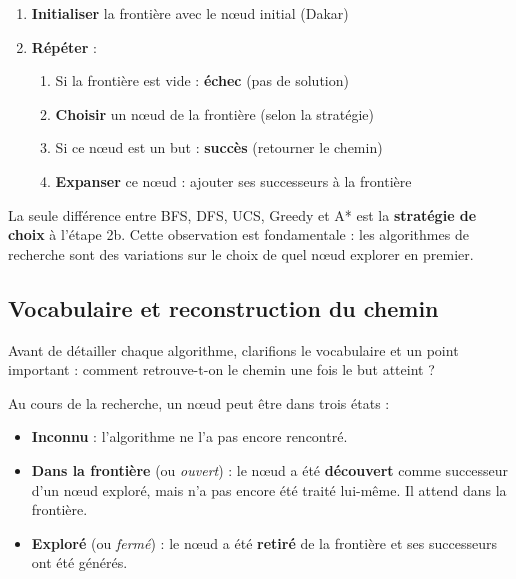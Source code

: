 \documentclass[11pt,a4paper]{article}
\begin{document}
\begin{recipebox}
\begin{enumerate}
    \item \textbf{Initialiser} la frontière avec le nœud initial (Dakar)
    \item \textbf{Répéter} :
    \begin{enumerate}
        \item Si la frontière est vide : \textbf{échec} (pas de solution)
        \item \textbf{Choisir} un nœud de la frontière (selon la stratégie)
        \item Si ce nœud est un but : \textbf{succès} (retourner le chemin)
        \item \textbf{Expanser} ce nœud : ajouter ses successeurs à la frontière
    \end{enumerate}
\end{enumerate}
\end{recipebox}

La seule différence entre BFS, DFS, UCS, Greedy et A* est la \textbf{stratégie de choix} à l'étape 2b. Cette observation est fondamentale : les algorithmes de recherche sont des variations sur le choix de quel nœud explorer en premier.

\subsection{Vocabulaire et reconstruction du chemin}

Avant de détailler chaque algorithme, clarifions le vocabulaire et un point important : comment retrouve-t-on le chemin une fois le but atteint ?

\begin{definitionbox}
Au cours de la recherche, un nœud peut être dans trois états :
\begin{itemize}
    \item \textbf{Inconnu} : l'algorithme ne l'a pas encore rencontré.
    \item \textbf{Dans la frontière} (ou \textit{ouvert}) : le nœud a été \textbf{découvert} comme successeur d'un nœud exploré, mais n'a pas encore été traité lui-même. Il attend dans la frontière.
    \item \textbf{Exploré} (ou \textit{fermé}) : le nœud a été \textbf{retiré} de la frontière et ses successeurs ont été générés.
\end{itemize}
\end{definitionbox}
\end{document}
